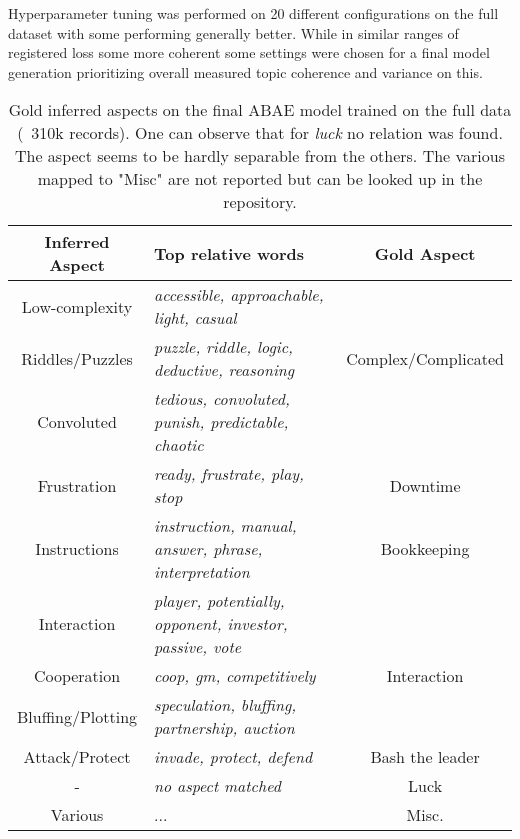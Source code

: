 Hyperparameter tuning was performed on 20 different configurations on the full dataset
with some performing generally better.
While in similar ranges of registered loss some more coherent some settings were chosen for a final model generation
prioritizing overall measured topic coherence and variance on this.
\begin{center}
    \begin{table}
        \begin{tabular}{c l c}
            \hline
            Inferred Aspect   & Top relative words                                              & Gold Aspect \\ [0.5ex]
            \hline\hline
            Low-complexity    & \textit{accessible, approachable, light, casual}                &                     \\
            Riddles/Puzzles   & \textit{puzzle, riddle, logic, deductive, reasoning}            & Complex/Complicated \\
            Convoluted        & \textit{tedious, convoluted, punish, predictable, chaotic}      &                     \\
            \hline
            Frustration       & \textit{ready, frustrate, play, stop}                           & Downtime            \\
            \hline
            Instructions      & \textit{instruction, manual, answer, phrase, interpretation}    & Bookkeeping         \\
            \hline
            Interaction       & \textit{player, potentially, opponent, investor, passive, vote} &                     \\
            Cooperation       & \textit{coop, gm, competitively}                                & Interaction         \\
            Bluffing/Plotting & \textit{speculation, bluffing, partnership, auction}            &                     \\
            \hline
            Attack/Protect    & \textit{invade, protect, defend}                                & Bash the leader     \\
            \hline
            -                 & \textit{no aspect matched}                                      & Luck                \\
            \hline
            Various           & ...                                                             & Misc.               \\
            \hline
        \end{tabular}
        \caption{Gold inferred aspects on the final ABAE model trained on the full data (~310k records).
        One can observe that for \textit{luck} no relation was found.
        The aspect seems to be hardly separable from the others.
        The various mapped to "Misc" are not reported but can be looked up in the repository.
        }
        \label{best-310}

    \end{table}

\end{center}

